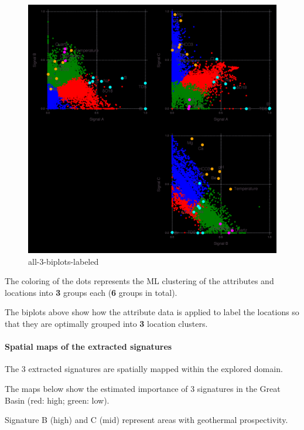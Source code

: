 \documentclass[11pt]{article}
\begin{document}
\begin{figure}
\centering
\includegraphics{../figures-postprocessing-nl-640/all-3-biplots-labeled.png}
\caption{all-3-biplots-labeled}
\end{figure}

The coloring of the dots represents the ML clustering of the attributes
and locations into \textbf{3} groups each (\textbf{6} groups in total).

The biplots above show how the attribute data is applied to label the
locations so that they are optimally grouped into \textbf{3} location
clusters.

    \hypertarget{spatial-maps-of-the-extracted-signatures}{%
\paragraph{Spatial maps of the extracted
signatures}\label{spatial-maps-of-the-extracted-signatures}}

The 3 extracted signatures are spatially mapped within the explored
domain.

The maps below show the estimated importance of 3 signatures in the
Great Basin (red: high; green: low).

Signature B (high) and C (mid) represent areas with geothermal
prospectivity.
\end{document}
